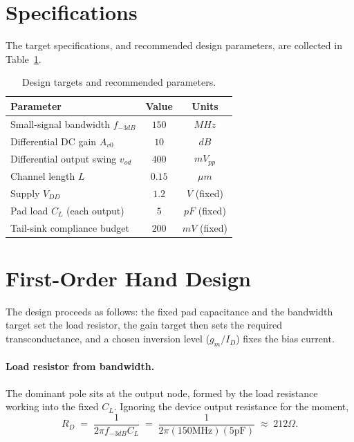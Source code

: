 \documentclass{article}
\begin{document}
\section{Specifications}
\label{sec:specs}
The target specifications, and recommended design parameters, are collected
in Table~\ref{tab:specs}.

\begin{table}[H]
    \centering
    \caption{Design targets and recommended parameters.}
    \label{tab:specs}
    \begin{tabular}{l|c|c} \hline
        \textbf{Parameter} & \textbf{Value} & \textbf{Units} \\ \hline
        Small-signal bandwidth $f_{-3dB}$ & $150$ & $MHz$ \\ \hline
        Differential DC gain $A_{v0}$ & $10$ & $dB$ \\ \hline
        Differential output swing $v_{od}$ & $400$ & $mV_{pp}$ \\ \hline
        Channel length $L$ & $0.15$ & $\mu m$ \\ \hline \hline
        Supply $V_{DD}$ & $1.2$ & $V$ (fixed) \\ \hline
        Pad load $C_L$ (each output) & $5$ & $pF$ (fixed) \\ \hline
        Tail-sink compliance budget & $200$ & $mV$ (fixed) \\ \hline
    \end{tabular}
\end{table}

\section{First-Order Hand Design}
\label{sec:hand}
The design proceeds as follows: the fixed pad capacitance and the bandwidth target set the
load resistor, the gain target then sets the required transconductance, and a chosen
inversion level ($g_m/I_D$) fixes the bias current.

\paragraph{Load resistor from bandwidth.} The dominant pole sits at the output node,
formed by the load resistance working into the fixed $C_L$. Ignoring the device output
resistance for the moment,
\begin{equation}
    R_D \;=\; \frac{1}{2\pi f_{-3dB} C_L}
           \;=\; \frac{1}{2\pi(150\mathrm{MHz})(5\mathrm{pF})}
           \;\approx\; 212\Omega .
    \label{eq:RD}
\end{equation}
\end{document}
